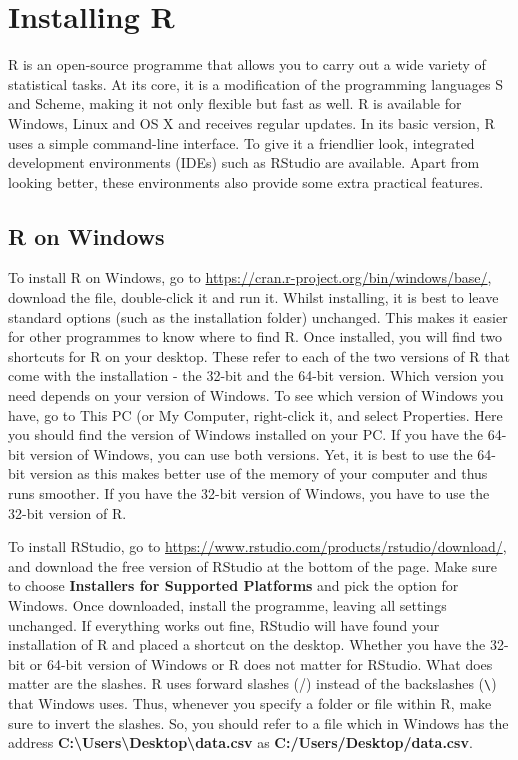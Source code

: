 \documentclass[
]{book}
\begin{document}
\hypertarget{installing-r}{%
\section{Installing R}\label{installing-r}}

R is an open-source programme that allows you to carry out a wide variety of statistical tasks. At its core, it is a modification of the programming languages S and Scheme, making it not only flexible but fast as well. R is available for Windows, Linux and OS X and receives regular updates. In its basic version, R uses a simple command-line interface. To give it a friendlier look, integrated development environments (IDEs) such as RStudio are available. Apart from looking better, these environments also provide some extra practical features.

\hypertarget{r-on-windows}{%
\subsection{R on Windows}\label{r-on-windows}}

To install R on Windows, go to \url{https://cran.r-project.org/bin/windows/base/}, download the file, double-click it and run it. Whilst installing, it is best to leave standard options (such as the installation folder) unchanged. This makes it easier for other programmes to know where to find R. Once installed, you will find two shortcuts for R on your desktop. These refer to each of the two versions of R that come with the installation - the 32-bit and the 64-bit version. Which version you need depends on your version of Windows. To see which version of Windows you have, go to This PC (or My Computer, right-click it, and select Properties. Here you should find the version of Windows installed on your PC. If you have the 64-bit version of Windows, you can use both versions. Yet, it is best to use the 64-bit version as this makes better use of the memory of your computer and thus runs smoother. If you have the 32-bit version of Windows, you have to use the 32-bit version of R.

To install RStudio, go to \url{https://www.rstudio.com/products/rstudio/download/}, and download the free version of RStudio at the bottom of the page. Make sure to choose \textbf{Installers for Supported Platforms} and pick the option for Windows. Once downloaded, install the programme, leaving all settings unchanged. If everything works out fine, RStudio will have found your installation of R and placed a shortcut on the desktop. Whether you have the 32-bit or 64-bit version of Windows or R does not matter for RStudio. What does matter are the slashes. R uses forward slashes (/) instead of the backslashes (\texttt{\textbackslash{}}) that Windows uses. Thus, whenever you specify a folder or file within R, make sure to invert the slashes. So, you should refer to a file which in Windows has the address \textbf{C:\textbackslash Users\textbackslash Desktop\textbackslash data.csv} as \textbf{C:/Users/Desktop/data.csv}.
\end{document}
